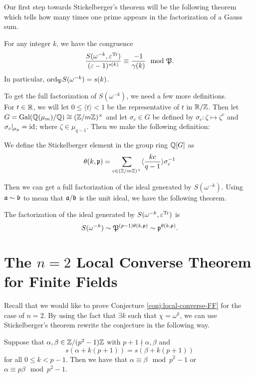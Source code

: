 Our first step towards Stickelberger's theorem will be the following theorem which tells how many times one prime appears in the factorization of a Gauss sum.
\begin{theorem}\label{thm:Stickelberger}
For any integer $k$, we have the congruence 
\[\frac{S(\omega^{-k}, \varepsilon^{\textrm{Tr}})}{(\varepsilon - 1)^{s(k)}} \equiv \frac{-1}{\gamma(k)} \mod {\mathfrak{P}}.\]
In particular, $\textrm{ord}_{\mathfrak{P}} S(\omega^{-k}) = s(k)$.
\end{theorem}
To get the full factorization of $S(\omega^{-k})$, we need a few more definitions.\\

For $t \in \mathbb{R}$, we will let $0 \leq \langle t \rangle < 1$ be the representative of $t$ in $ \mathbb{R} / \mathbb{Z}$. 
Then let $G = \textrm{Gal}(\mathbb{Q}(\mu_m)/\mathbb{Q}) \cong (\mathbb{Z} / m\mathbb{Z})^\times$ and let $\sigma_c \in G$ be defined by $\sigma_c : \zeta \mapsto \zeta^c$ and $\sigma_c|_{\mu_p}  = \textrm{id}$; where $\zeta \in \mu_{q-1}$.
Then we make the following definition: 
\begin{defn}
We define the Stickelberger element in the group ring $\mathbb{Q}[G]$ as 
\[\theta(k,\mathfrak{p}) = \sum_{c \in (\mathbb{Z}/m\mathbb{Z})^\times} \langle \frac{kc}{q-1}\rangle \sigma_c^{-1}\]
\end{defn}
Then we can get a full factorization of the ideal generated by $S(\omega^{-k})$. Using $\mathfrak{a} \sim \mathfrak{b}$ to mean that $\mathfrak{a} / \mathfrak{b}$ is the unit ideal, we have the following theorem.
\begin{theorem}
The factorization of the ideal generated by $S(\omega^{-k}, \varepsilon^{\textrm{Tr}})$ is \[S(\omega^{-k}) \sim \mathfrak{P}^{(p-1)\theta(k, \mathfrak{p})} \sim \mathfrak{p}^{\theta(k,\mathfrak{p})}.\]
\end{theorem}



\section{The $n=2$ Local Converse Theorem for Finite Fields}
\label{sec:n=2-LCT-FF}

Recall that we would like to prove Conjecture \ref{conj:local-converse-FF} for the case of $n=2$.
By using the fact that $\exists k$ such that $\chi = \omega^k$, we can use Stickelberger's theorem rewrite the conjecture in the following way.

\begin{theorem}\label{thm:local-converse-FF-rewrite}
Suppose that $\alpha, \beta \in \mathbb{Z}/(p^2 -1)\mathbb{Z}$ with $p+1 \nmid \alpha, \beta$ and \[s(\alpha + k(p+1)) = s(\beta + k(p+1))\] for all $0 \leq k < p-1$. Then we have that $\alpha \equiv \beta \mod p^2 - 1$ or $\alpha \equiv p \beta \mod p^2 -1$.
\end{theorem}

